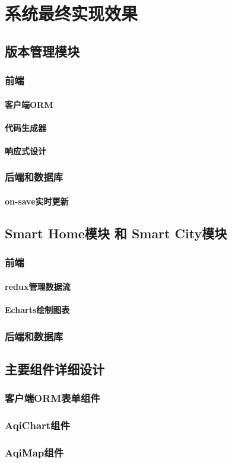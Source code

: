 
\chapter{系统最终实现效果}
\label{chap:final_effect}

\section{版本管理模块}
\subsection{前端}
\subsubsection{客户端ORM}
\subsubsection{代码生成器}
\subsubsection{响应式设计}
\subsection{后端和数据库}
\subsubsection{on-save实时更新}
\section{Smart Home模块 和 Smart City模块}
\subsection{前端}
\subsubsection{redux管理数据流}
\subsubsection{Echarts绘制图表}
\subsection{后端和数据库}
\section{主要组件详细设计}
\subsection{客户端ORM表单组件}
\subsection{AqiChart组件}
\subsection{AqiMap组件}
